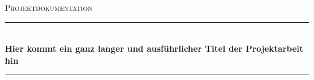 \begin{titlepage}

\begin{center}



\textsc{\huge Projektdokumentation}\\[1.5cm]



\newcommand{\HRule}{\rule{\linewidth}{0.5mm}}
\HRule \\[0.4cm]
{ \huge \bfseries Hier kommt ein ganz langer und ausführlicher Titel der Projektarbeit hin}\\[0.4cm]

\HRule \\[1.5cm]


\end{center}
\end{titlepage}
